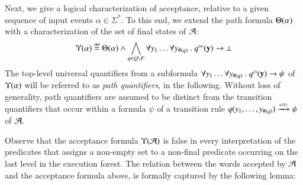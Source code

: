 \documentclass{llncs}
\begin{document}
Next, we give a logical characterization of acceptance, relative to a
given sequence of input events $\alpha \in \Sigma^*$. To this end, we
extend the path formula $\Theta({\alpha})$ with a characterization of
the set of final states of $\mathcal{A}$: 
\begin{equation}\label{eq:accform}
\Upsilon({\alpha}) \stackrel{\scriptscriptstyle{\mathsf{def}}}{=} \Theta({\alpha}) \wedge \bigwedge_{q
  \in Q \setminus F} \forall y_1 \ldots \forall y_{\#(q)} ~.~
{q}^{\scriptscriptstyle{({n})}}(\mathbf y) \rightarrow \bot
\end{equation}
The top-level universal quantifiers from a subformula $\forall y_1
\ldots \forall y_{\#(q)} ~.~ {q}^{\scriptscriptstyle{({i})}}(\mathbf y) \rightarrow \psi$
of $\Upsilon({\alpha})$ will be referred to as \emph{path quantifiers},
in the following. Without loss of generality, path quantifiers are
assumed to be distinct from the transition quantifiers that occur
within a formula $\psi$ of a transition rule $q(y_1,\ldots,y_{\#(q)})
\xrightarrow{{\scriptscriptstyle a(X)}}_{{\scriptstyle }} \psi$ of $\mathcal{A}$.

Observe that the acceptance formula $\Upsilon({\mathcal{A}})$ is false in every
interpretation of the predicates that assigns a non-empty set to a
non-final predicate occurring on the last level in the execution
forest. The relation between the words accepted by $\mathcal{A}$ and the
acceptance formula above, is formally captured by the following lemma:
\end{document}
